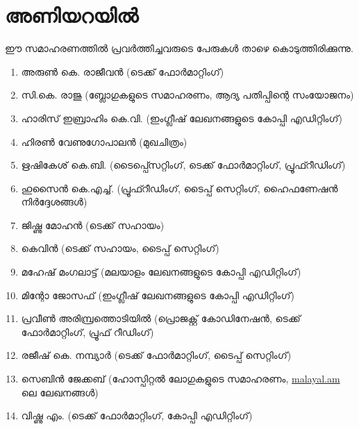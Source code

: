 ﻿\section*{അണിയറയില്‍}
ഈ സമാഹരണത്തില്‍ പ്രവര്‍ത്തിച്ചവരുടെ പേരുകള്‍ താഴെ കൊടുത്തിരിക്കുന്നു. 

\begin{enumerate}[noitemsep]
 \item അരുണ്‍ കെ. രാജീവന്‍ (ടെക്ക് ഫോര്‍മാറ്റിംഗ്)
 \item സി.കെ. രാജു (ബ്ലോഗുകളുടെ സമാഹരണം, ആദ്യ പതിപ്പിന്റെ സംയോജനം)
 \item ഹാരിസ് ഇബ്രാഹിം  കെ.വി. (ഇംഗ്ലീഷ് ലേഖനങ്ങളുടെ കോപ്പി എഡിറ്റിംഗ്)
 \item ഹിരണ്‍ വേണുഗോപാലന്‍ (മുഖചിത്രം)
 \item ഋഷികേശ് കെ.ബി. (ടൈപ്പ്സെറ്റിംഗ്, ടെക്ക് ഫോര്‍മാറ്റിംഗ്, പ്രൂഫ്റീഡിംഗ്)
 \item ഹുസൈന്‍ കെ.എച്ച്. (പ്രൂഫ്റീഡിംഗ്, ടൈപ്പ് സെറ്റിംഗ്, ഹൈഫണേഷന്‍ നിര്‍ദ്ദേശങ്ങള്‍)
 \item ജിഷ്ണു മോഹന്‍ (ടെക്ക് സഹായം)  
 \item കെവിന്‍ (ടെക്ക് സഹായം, ടൈപ്പ് സെറ്റിംഗ്)
 \item മഹേഷ് മംഗലാട്ട് (മലയാളം ലേഖനങ്ങളുടെ കോപ്പി എഡിറ്റിംഗ്)
 \item മിന്റോ ജോസഫ് (ഇംഗ്ലീഷ് ലേഖനങ്ങളുടെ കോപ്പി എഡിറ്റിംഗ്)
 \item പ്രവീണ്‍ അരിമ്പ്രത്തൊടിയില്‍ (പ്രൊജക്റ്റ് കോഡിനേഷന്‍, ടെക്ക് ഫോര്‍മാറ്റിംഗ്, പ്രൂഫ് റീഡിംഗ്)
 \item രജീഷ് കെ. നമ്പ്യാര്‍ (ടെക്ക് ഫോര്‍മാറ്റിംഗ്, ടൈപ്പ് സെറ്റിംഗ്)
 \item സെബിന്‍ ജേക്കബ് (ഹോസ്പിറ്റല്‍ ലോഗുകളുടെ സമാഹരണം, \url{malayal.am} ലെ ലേഖനങ്ങള്‍)
 \item വിഷ്ണു എം. (ടെക്ക് ഫോര്‍മാറ്റിംഗ്, കോപ്പി എഡിറ്റിംഗ്)
\end{enumerate}

\newpage

